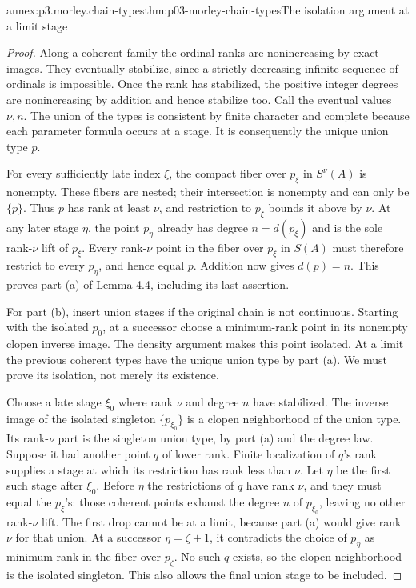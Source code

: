 \begin{annexitem}{annex:p3.morley.chain-types}{thm:p03-morley-chain-types}{The isolation argument at a limit stage}
\begin{proof}
Along a coherent family the ordinal
ranks are nonincreasing by exact
images. They eventually stabilize,
since a strictly decreasing infinite
sequence of ordinals is impossible.
Once the rank has stabilized, the
positive integer degrees are
nonincreasing by addition and hence
stabilize too. Call the eventual
values \(\nu,n\). The union of
the types is consistent by finite
character and complete because each
parameter formula occurs at a stage.
It is consequently the unique union
type \(p\).

For every sufficiently late index
\(\xi\), the compact fiber over
\(p_\xi\) in \(S^\nu(A)\) is
nonempty. These fibers are nested;
their intersection is nonempty and
can only be \(\{p\}\). Thus
\(p\) has rank at least \(\nu\),
and restriction to \(p_\xi\)
bounds it above by \(\nu\).
At any later stage \(\eta\), the
point \(p_\eta\) already has degree
\(n=d(p_\xi)\) and is the sole
rank-\(\nu\) lift of \(p_\xi\).
Every rank-\(\nu\) point in the
fiber over \(p_\xi\) in \(S(A)\)
must therefore restrict to every
\(p_\eta\), and hence equal \(p\).
Addition now gives \(d(p)=n\).
This proves part (a) of Lemma 4.4,
including its last assertion.

For part (b), insert union stages
if the original chain is not
continuous. Starting with the
isolated \(p_0\), at a successor
choose a minimum-rank point in its
nonempty clopen inverse image.
The density argument makes this
point isolated. At a limit the
previous coherent types have the
unique union type by part (a).
We must prove its isolation, not
merely its existence.

Choose a late stage \(\xi_0\)
where rank \(\nu\) and degree
\(n\) have stabilized. The
inverse image of the isolated
singleton \(\{p_{\xi_0}\}\)
is a clopen neighborhood of the
union type. Its rank-\(\nu\)
part is the singleton union
type, by part (a) and the
degree law. Suppose it had
another point \(q\) of lower
rank. Finite localization of
\(q\)'s rank supplies a stage
at which its restriction has
rank less than \(\nu\).
Let \(\eta\) be the first
such stage after \(\xi_0\).
Before \(\eta\) the restrictions
of \(q\) have rank \(\nu\),
and they must equal the
\(p_\xi\)'s: those coherent
points exhaust the degree
\(n\) of \(p_{\xi_0}\),
leaving no other rank-\(\nu\)
lift. The first drop cannot
be at a limit, because part
(a) would give rank \(\nu\)
for that union. At a successor
\(\eta=\zeta+1\), it contradicts
the choice of \(p_\eta\)
as minimum rank in the
fiber over \(p_\zeta\).
No such \(q\) exists, so
the clopen neighborhood is
the isolated singleton.
This also allows the final
union stage to be included.
\end{proof}
\end{annexitem}

